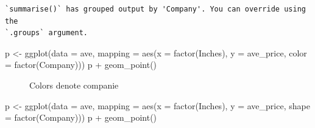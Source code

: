 \documentclass[
  letterpaper,
]{article}
\newenvironment{Shaded}{\begin{snugshade}}{\end{snugshade}}
\newcommand{\AttributeTok}[1]{\textcolor[rgb]{0.40,0.45,0.13}{#1}}
\newcommand{\FunctionTok}[1]{\textcolor[rgb]{0.28,0.35,0.67}{#1}}
\newcommand{\NormalTok}[1]{\textcolor[rgb]{0.00,0.23,0.31}{#1}}
\newcommand{\OtherTok}[1]{\textcolor[rgb]{0.00,0.23,0.31}{#1}}
\newcommand{\SpecialCharTok}[1]{\textcolor[rgb]{0.37,0.37,0.37}{#1}}
\begin{document}
\begin{verbatim}
`summarise()` has grouped output by 'Company'. You can override using the
`.groups` argument.
\end{verbatim}

\begin{Shaded}
\begin{Highlighting}[]
\NormalTok{p }\OtherTok{\textless{}{-}} \FunctionTok{ggplot}\NormalTok{(}\AttributeTok{data =}\NormalTok{ ave, }\AttributeTok{mapping =} \FunctionTok{aes}\NormalTok{(}\AttributeTok{x =} \FunctionTok{factor}\NormalTok{(Inches), }\AttributeTok{y =}\NormalTok{ ave\_price, }\AttributeTok{color =} \FunctionTok{factor}\NormalTok{(Company)))}
\NormalTok{p }\SpecialCharTok{+} \FunctionTok{geom\_point}\NormalTok{()}
\end{Highlighting}
\end{Shaded}

\begin{figure}[H]


\caption{\label{fig-colors}Colors denote companie}

\end{figure}%

\begin{Shaded}
\begin{Highlighting}[]
\NormalTok{p }\OtherTok{\textless{}{-}} \FunctionTok{ggplot}\NormalTok{(}\AttributeTok{data =}\NormalTok{ ave, }\AttributeTok{mapping =} \FunctionTok{aes}\NormalTok{(}\AttributeTok{x =} \FunctionTok{factor}\NormalTok{(Inches), }\AttributeTok{y =}\NormalTok{ ave\_price, }\AttributeTok{shape =} \FunctionTok{factor}\NormalTok{(Company)))}
\NormalTok{p }\SpecialCharTok{+} \FunctionTok{geom\_point}\NormalTok{()}
\end{Highlighting}
\end{Shaded}
\end{document}
